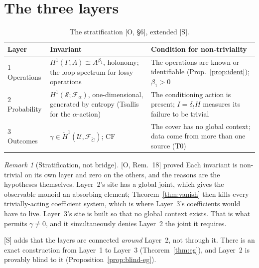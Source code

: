 \documentclass[11pt]{article}
\theoremstyle{definition}
\theoremstyle{remark}
\newtheorem{remark}[theorem]{Remark}
\newcommand{\CF}{\mathrm{CF}}
\newcommand{\src}[1]{\textsf{\small[#1]}}
\newcommand{\st}[1]{\textsf{\small\color{gray}#1}}
\begin{document}
\section{The three layers}

\begin{table}[!htbp]\centering
\begin{tabularx}{\linewidth}{@{}l>{\raggedright}X>{\raggedright\arraybackslash}X@{}}
\toprule
Layer & Invariant & Condition for non-triviality\\
\midrule
1 Operations & $H^1(\Gamma,A)\cong A^{\beta_1}$, holonomy; the loop spectrum for lossy operations & The operations are known or identifiable (Prop.~\ref{prop:ident}); $\beta_1>0$\\
2 Probability & $H^1(\mathcal S;\mathcal F_\alpha)$, one-dimensional, generated by entropy (Tsallis for the $\alpha$-action) & The conditioning action is present; $I=\delta_tH$ measures its failure to be trivial\\
3 Outcomes & $\gamma\in\check H^1(\mathcal U,\mathcal F_{\tilde C})$; $\CF$ & The cover has no global context; data come from more than one source (T0)\\
\bottomrule
\end{tabularx}
\caption{The stratification \src{O, \S6}, extended \src{S}.}
\end{table}

\begin{remark}[Stratification, not bridge]
\src{O, Rem.~18} \st{proved}
Each invariant is non-trivial on its own layer and zero on the others, and the reasons are the hypotheses themselves. Layer~2's site has a global joint, which gives the observable monoid an absorbing element; Theorem~\ref{thm:vanish} then kills every trivially-acting coefficient system, which is where Layer~3's coefficients would have to live. Layer~3's site is built so that no global context exists. That is what permits $\gamma\neq0$, and it simultaneously denies Layer~2 the joint it requires.

\src{S} adds that the layers are connected \emph{around} Layer~2, not through it. There is an exact construction from Layer~1 to Layer~3 (Theorem~\ref{thm:eg}), and Layer~2 is provably blind to it (Proposition~\ref{prop:blind-eg}).
\end{remark}

\end{document}
